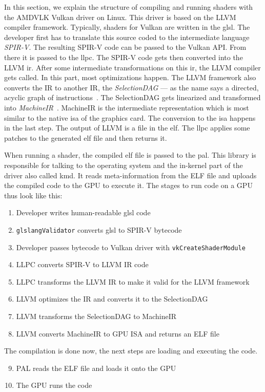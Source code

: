 In this section, we explain the structure of compiling and running shaders with the AMDVLK Vulkan driver on Linux. This driver is based on the LLVM compiler framework. Typically, shaders for Vulkan are written in the \gls{glsl}. The developer first has to translate this source coded to the intermediate language \emph{SPIR-V}. The resulting SPIR-V code can be passed to the Vulkan API.
From there it is passed to the \gls{llpc}. The SPIR-V code gets then converted into the LLVM \gls{ir}. After some intermediate transformations on this \gls{ir}, the LLVM compiler gets called. In this part, most optimizations happen.
The LLVM framework also converts the IR to another IR, the \emph{SelectionDAG} --- as the name says a directed, acyclic graph of instructions~\cite{llvmSelectionDag}. The SelectionDAG gets linearized and transformed into \emph{MachineIR}~\cite{llvmSelectionDag}. MachineIR is the intermediate representation which is most similar to the native \gls{isa} of the graphics card. The conversion to the \gls{isa} happens in the last step. The output of LLVM is a file in the \acrfull{elf}. The \gls{llpc} applies some patches to the generated \gls{elf} file and then returns it.

When running a shader, the compiled \gls{elf} file is passed to the \gls{pal}. This library is responsible for talking to the operating system and the in-kernel part of the driver also called \gls{kmd}. It reads meta-information from the ELF file and uploads the compiled code to the GPU to execute it. The stages to run code on a GPU thus look like this:

\begin{enumerate}
	\item Developer writes human-readable \gls{glsl} code
	\item \texttt{glslangValidator} converts \gls{glsl} to SPIR-V bytecode
	\item Developer passes bytecode to Vulkan driver with \texttt{vkCreateShaderModule}
	\item LLPC converts SPIR-V to LLVM IR code
	\item LLPC transforms the LLVM IR to make it valid for the LLVM framework
	\item LLVM optimizes the IR and converts it to the SelectionDAG
	\item LLVM transforms the SelectionDAG to MachineIR
	\item LLVM converts MachineIR to GPU ISA and returns an ELF file
\end{enumerate}
The compilation is done now, the next steps are loading and executing the code.
\begin{enumerate}
	\setcounter{enumi}{8}
	\item PAL reads the ELF file and loads it onto the GPU
	\item The GPU runs the code
\end{enumerate}

